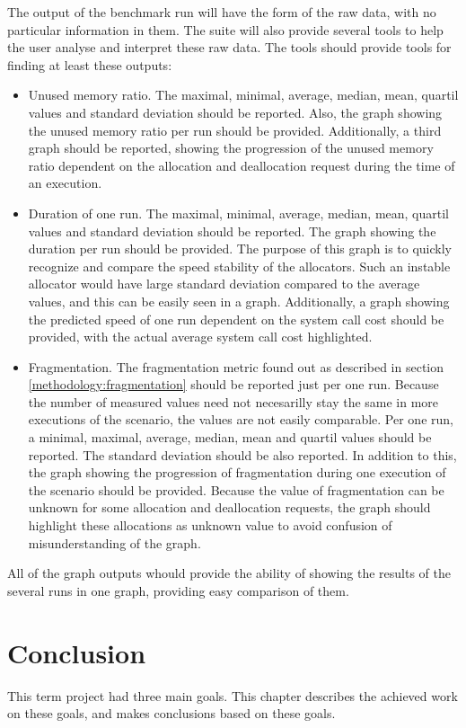 The output of the benchmark run will have the form of the raw data, with no particular information in them. The suite will also provide several tools to help the user analyse and interpret these raw data. The tools should provide tools for finding at least these outputs:
\begin{itemize}
\item Unused memory ratio. The maximal, minimal, average, median, mean, quartil values and standard deviation should be reported. Also, the graph showing the unused memory ratio per run should be provided. Additionally, a third graph should be reported, showing the progression of the unused memory ratio dependent on the allocation and deallocation request during the time of an execution.
\item Duration of one run. The maximal, minimal, average, median, mean, quartil values and standard deviation should be reported. The graph showing the duration per run should be provided. The purpose of this graph is to quickly recognize and compare the speed stability of the allocators. Such an instable allocator would have large standard deviation compared to the average values, and this can be easily seen in a graph. Additionally, a graph showing the predicted speed of one run dependent on the system call cost should be provided, with the actual average system call cost highlighted.
\item Fragmentation. The fragmentation metric found out as described in section \ref{methodology:fragmentation} should be reported just per one run. Because the number of measured values need not necesarilly stay the same in more executions of the scenario, the values are not easily comparable. Per one run, a minimal, maximal, average, median, mean and quartil values should be reported. The standard deviation should be also reported. In addition to this, the graph showing the progression of fragmentation during one execution of the scenario should be provided. Because the value of fragmentation can be unknown for some allocation and deallocation requests, the graph should highlight these allocations as unknown value to avoid confusion of misunderstanding of the graph.
\end{itemize}

All of the graph outputs whould provide the ability of showing the results of the several runs in one graph, providing easy comparison of them.
\chapter{Conclusion}
This term project had three main goals. This chapter describes the achieved work on these goals, and makes conclusions based on these goals.
